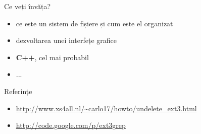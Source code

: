 \documentclass{beamer}
\begin{document}
\begin{frame}{Ce veți învăța?}
\begin{itemize}
 \item ce este un sistem de fișiere și cum este el organizat 
 \item dezvoltarea unei interfețe grafice
 \item \textbf{C++}, cel mai probabil
 \item ...
\end{itemize}
\end{frame}

\begin{frame}{Referințe}
\begin{itemize}
\item \url{http://www.xs4all.nl/~carlo17/howto/undelete\_ext3.html}
\item \url{http://code.google.com/p/ext3grep}
\end{itemize}
\end{frame}
\end{document}
